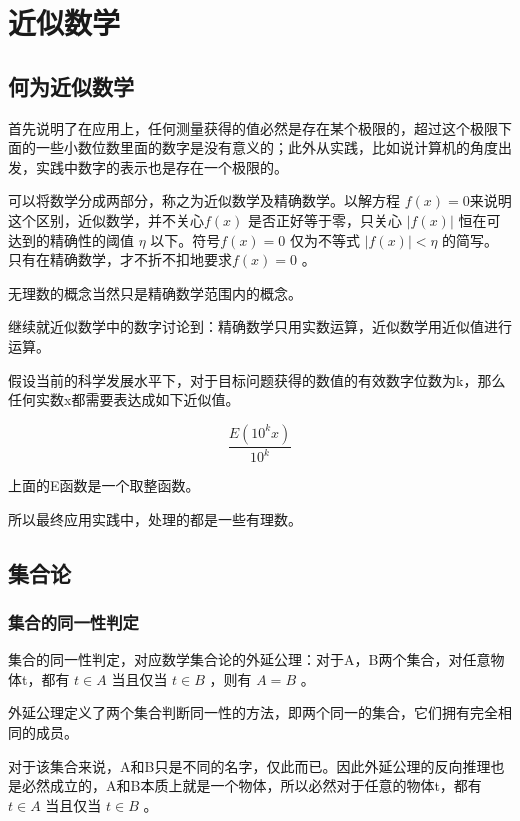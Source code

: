 \documentclass[12pt,oneside]{book}
\begin{document}
\part{近似数学}
\chapter{何为近似数学}
\cite{高观点下的初等数学第一卷}首先说明了在应用上，任何测量获得的值必然是存在某个极限的，超过这个极限下面的一些小数位数里面的数字是没有意义的；此外从实践，比如说计算机的角度出发，实践中数字的表示也是存在一个极限的。

\begin{bookref}[frametitle={\cite{高观点下的初等数学第一卷}}]
可以将数学分成两部分，称之为近似数学及精确数学。以解方程 $f(x) = 0$来说明这个区别，近似数学，并不关心$f(x)$ 是否正好等于零，只关心 $|f(x)|$ 恒在可达到的精确性的阈值 $\eta$ 以下。符号$f(x)=0$ 仅为不等式 $|f(x)| < \eta$ 的简写。只有在精确数学，才不折不扣地要求$f(x)=0$ 。


无理数的概念当然只是精确数学范围内的概念。
\end{bookref}


\cite{高观点下的初等数学第三卷}继续就近似数学中的数字讨论到：精确数学只用实数运算，近似数学用近似值进行运算。

假设当前的科学发展水平下，对于目标问题获得的数值的有效数字位数为k，那么任何实数x都需要表达成如下近似值。

\[
\frac{E(10^k x)}{10^k}
\]

上面的E函数是一个取整函数。

所以最终应用实践中，处理的都是一些有理数。







\chapter{集合论}
\section{集合的同一性判定}
集合的同一性判定，对应数学集合论的外延公理：对于A，B两个集合，对任意物体t，都有 $t \in A$ 当且仅当 $t \in B$ ，则有 $A=B$ 。

外延公理定义了两个集合判断同一性的方法，即两个同一的集合，它们拥有完全相同的成员。

对于该集合来说，A和B只是不同的名字，仅此而已。因此外延公理的反向推理也是必然成立的，A和B本质上就是一个物体，所以必然对于任意的物体t，都有 $t \in A$ 当且仅当 $t \in B$ 。
\end{document}
